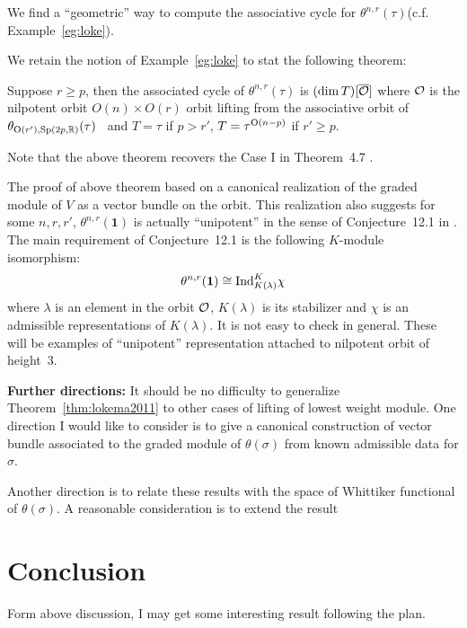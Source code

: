 \documentclass{amsart}
\begin{document}
We find a ``geometric'' way to compute the associative cycle for
$\theta^{n,r}(\tau)$(c.f. Example~\ref{eg:loke}).

We retain the notion of Example~\ref{eg:loke} to stat the following theorem:
\begin{thm} \label{thm:lokema2011}
Suppose $r\geq p$, then the associated cycle of $\theta^{n,r}(\tau)$ is 
$(\dim T)[\overline{\mathcal{O}}]$ where $\mathcal{O}$ is the nilpotent orbit $O(n)\times O(r)$ orbit lifting from the associative
orbit of $\theta_{{\rm O}(r'),{\rm Sp}(2p,{\mathbb{R}})}(\tau)$~\cite{NishyamaZhu2004} 
and $T= \tau$ if $p>r'$, $T=\tau^{{\rm O}(n-p)}$ if $r'\geq p$.  
\end{thm}
Note that the above theorem recovers the Case I in Theorem~4.7  \cite{NishyamaZhu2004}.

The proof of above theorem based on a canonical realization of the
graded module of $V$ as a vector bundle on the orbit. This realization
also suggests for some  $n,r,r'$,  $\theta^{n,r}(\mathbf{1})$ is
actually ``unipotent''  in the sense of Conjecture~12.1 in
\cite{Vogan1989Var}. The main requirement of Conjecture~12.1 is the
following $K$-module isomorphism:
 \[
\theta^{n,r}(\mathbf{1})\cong {\rm Ind}_{K(\lambda)}^K\chi
\]
where $\lambda$ is an element in the orbit $\mathcal{O}$, $K(\lambda)$ is its
stabilizer and 
$\chi$ is an  admissible representations of $K(\lambda)$.
It is not easy to check in general.
These will be examples of ``unipotent'' representation attached to
nilpotent orbit of height~3. 



{\bf Further directions:} It should be no difficulty to generalize Theorem~\ref{thm:lokema2011}
to other cases of lifting of lowest weight module. One direction I would like to consider
is to give a canonical construction of vector bundle associated to
the graded module of $\theta(\sigma)$ from known admissible data for $\sigma$.

Another direction is to relate these results with the space of
Whittiker functional of $\theta(\sigma)$. A reasonable consideration
is to extend the result 

\section{Conclusion}
Form above discussion, I may get some interesting result following the plan.

{}

\end{document}
